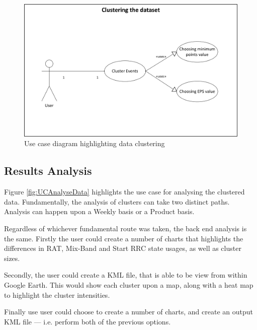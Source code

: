 \begin{figure}[H]
  \centering
    \includegraphics[scale=0.9]{chapter7/use_case/cluster_data.png}
    \caption[Use case diagram highlighting data clustering]
            {Use case diagram highlighting data clustering}
    \label{fig:UCClusterData}
\end{figure}


\subsection{Results Analysis}
Figure \ref{fig:UCAnalyseData} highlights the use case for analysing the 
clustered data. Fundamentally, the analysis of clusters can take two distinct 
paths. Analysis can happen upon a Weekly basis or a Product basis.

Regardless of whichever fundamental route was taken, the back end analysis is 
the same. Firstly the user could create a number of charts that highlights the 
differences in RAT, Mix-Band and Start RRC state usages, as well as cluster 
sizes.

Secondly, the user could create a KML file, that is able to be view from within
Google Earth. This would show each cluster upon a map, along with a heat map to 
highlight the cluster intensities.

Finally use user could choose to create a number of charts, and create an 
output KML file --- i.e. perform both of the previous options.

